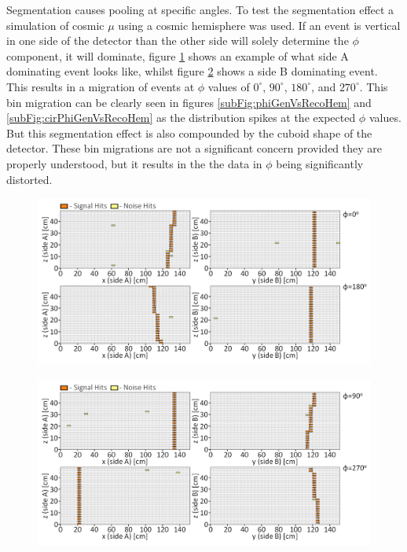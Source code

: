 Segmentation causes pooling at specific angles. To test the segmentation effect a simulation of cosmic $\mu$ using a cosmic hemisphere was used. If an event is vertical in one side of the detector than the other side will solely determine the $\phi$ component, it will dominate, figure  \ref{fig:cosmicBinMigrationSideA} shows an example of what side A dominating event looks like, whilst figure \ref{fig:cosmicBinMigrationSideB} shows a side B dominating event. This results in a migration of events at $\phi$ values of $0^\circ$, $90^\circ$, $180^\circ$, and $270^\circ$. This bin migration can be clearly seen in figures \ref{subFig:phiGenVsRecoHem} and \ref{subFig:cirPhiGenVsRecoHem} as the distribution spikes at the expected $\phi$ values. But this segmentation effect is also compounded by the cuboid shape of the detector. These bin migrations are not a significant concern provided they are properly understood, but it results in the the data in $\phi$ being significantly distorted.  
 
\begin{figure}[!h]
 \centering
 \includegraphics[width=\linewidth]{Chapter6/Figs/Raster/phiSideABinMigrationMedText.png}
 \label{fig:cosmicBinMigrationSideA}
\end{figure}

\begin{figure}[!h]
 \centering
 \includegraphics[width=\linewidth]{Chapter6/Figs/Raster/phiSideBBinMigrationMedText.png}
 \label{fig:cosmicBinMigrationSideB}
\end{figure}

